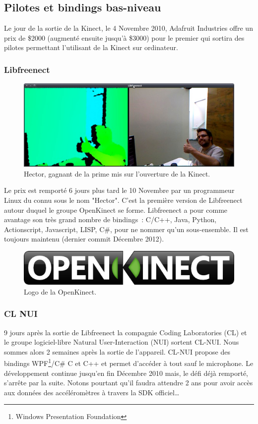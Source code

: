 \documentclass[french,12pt]{report}
\begin{document}
  \subsection{Pilotes et bindings bas-niveau}
  Le jour de la sortie de la Kinect, le 4 Novembre 2010, Adafruit Industries 
  offre un prix de \$2000 (augmenté ensuite jusqu'à \$3000) pour le premier qui
  sortira des pilotes permettant l'utilisant de la Kinect sur ordinateur.
  \subsubsection{Libfreenect}
  \begin{figure}[h!]
  \centering
  \includegraphics[width=\linewidth]{images/hector}
  \caption{Hector, gagnant de la prime mis sur l'ouverture de la Kinect.}
  \end{figure}
  Le prix est remporté 6 jours plus tard le 10 Novembre par un programmeur Linux
  du connu sous le nom "Hector". C'est la première version de Libfreenect autour
  duquel le groupe OpenKinect se forme. Libfreenect a pour comme avantage son
  très grand nombre de bindings~: C/C++, Java, Python, Actionscript, Javascript,
  LISP, C\#, pour ne nommer qu'un sous-ensemble. 
  Il est toujours maintenu (dernier commit Décembre 2012).
  \begin{figure}[h!]
  \centering
  \includegraphics[width=0.5\linewidth]{images/openkinect_logo}
  \caption{Logo de la OpenKinect.}
  \end{figure}
  \subsubsection{CL NUI}
  9 jours après la sortie de Libfreenect la compagnie Coding Laboratories 
  (CL) et le groupe logiciel-libre
  Natural User-Interaction (NUI) sortent CL-NUI. Nous sommes alors 2 semaines 
  après la sortie de l'appareil. CL-NUI propose des bindings 
  WPF\footnote{Windows Presentation Foundation}/C\# C et C++ et permet d'accéder 
  à tout sauf le microphone. Le développement continue jusqu'en fin Décembre 2010 
  mais,
  le défi déjà remporté, s'arrête par la suite. Notons pourtant qu'il faudra 
  attendre 2 ans pour avoir accès aux données des accéléromètres à travers la 
  SDK officiel\ldots
\end{document}
